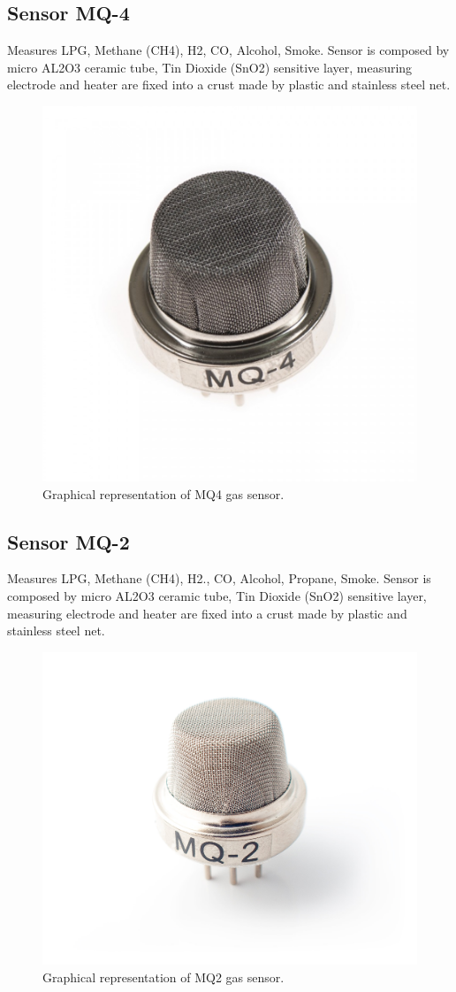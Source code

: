 \subsection{Sensor MQ-4}
Measures LPG, Methane (CH4), H2, CO, Alcohol, Smoke.
Sensor is composed by micro AL2O3 ceramic tube, Tin Dioxide (SnO2) sensitive layer,
measuring electrode and heater are fixed into a crust made by plastic and stainless steel net.
\begin{figure}[p]
    \centering
    \includegraphics[width=0.5\linewidth]{MQ4}
    \caption{Graphical representation of MQ4 gas sensor.}
    \label{fig:MQ4}
\end{figure}


\subsection{Sensor MQ-2}
Measures LPG, Methane (CH4), H2., CO, Alcohol, Propane, Smoke.
Sensor is composed by micro AL2O3 ceramic tube, Tin Dioxide (SnO2) sensitive layer,
measuring electrode and heater are fixed into a crust made by plastic and stainless steel net.
\begin{figure}[p]
    \centering
    \includegraphics[width=0.5\linewidth]{MQ2}
    \caption{Graphical representation of MQ2 gas sensor.}
    \label{fig:MQ2}
\end{figure}

